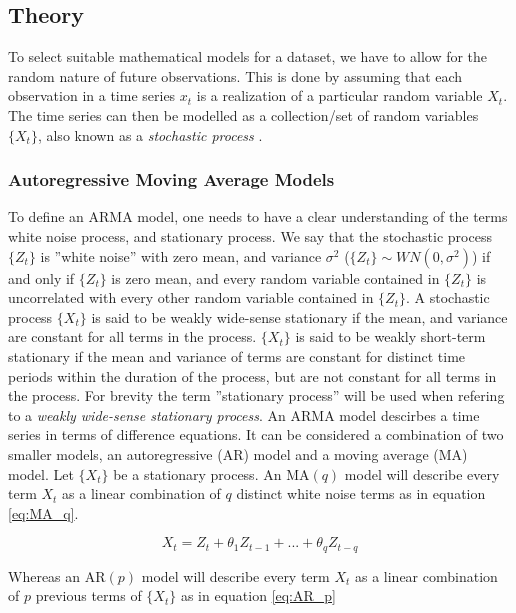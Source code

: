 \subsection{Theory} \label{sec:ts_models}
To select suitable mathematical models for a dataset, we have to allow for the random nature of future observations. 
This is done by assuming that each observation in a time series $x_t$ is a realization of a particular random variable $X_t$. 
The time series can then be modelled as a collection/set of random variables $\{X_t\}$, also known as a \textit{stochastic process} \cite{brockwell_davis_advanced}. 

\subsubsection*{Autoregressive Moving Average Models}
To define an ARMA model, one needs to have a clear understanding of the terms white noise process, and stationary process. 
We say that the stochastic process $\{Z_t\}$ is ''white noise'' with zero mean, and variance $\sigma^2$ ($\{Z_t\} \sim WN(0, \sigma^2)$) if and only if $\{Z_t\}$ is zero mean, and every random variable contained in $\{Z_t\}$ is uncorrelated with every other random variable contained in $\{Z_t\}$. 
A stochastic process $\{X_t\}$ is said to be weakly wide-sense stationary if the mean, and variance are constant for all terms in the process. 
$\{X_t\}$ is said to be weakly short-term stationary if the mean and variance of terms are constant for distinct time periods within the duration of the process, but are not constant for all terms in the process. 
For brevity the term ''stationary process'' will be used when refering to a \textit{weakly wide-sense stationary process}. 
An ARMA model descirbes a time series in terms of difference equations. 
It can be considered a combination of two smaller models, an autoregressive (AR) model and a moving average (MA) model. 
Let $\{X_t\}$ be a stationary process. 
An $\mathrm{MA}(q)$ model will describe every term $X_t$ as a linear combination of $q$ distinct white noise terms as in equation \eqref{eq:MA_q}.

\begin{equation}
    X_t = Z_{t} + \theta_1 Z_{t-1} + ... + \theta_q Z_{t-q}
    \label{eq:MA_q}
\end{equation}

Whereas an $\mathrm{AR}(p)$ model will describe every term $X_t$ as a linear combination of $p$ previous terms of $\{X_t\}$ as in equation \eqref{eq:AR_p}

